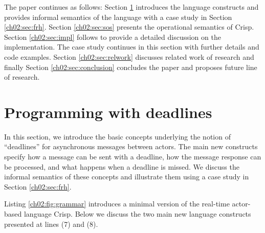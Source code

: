 
The paper continues as follows: Section \ref{ch02:sec:deadlines} introduces the language constructs
and provides informal semantics of the language with a case study in Section \ref{ch02:sec:frh}. 
Section \ref{ch02:sec:sos} presents the operational semantics of Crisp.
Section \ref{ch02:sec:impl} follows to provide a detailed discussion on the implementation.
The case study continues in this section with further details and code examples.
Section \ref{ch02:sec:relwork} discusses related work of research and 
finally Section \ref{ch02:sec:conclusion} concludes the paper and proposes future line of research.

\section{Programming with deadlines} \label{ch02:sec:deadlines}
In this section, we introduce the basic concepts underlying  the notion of ``deadlines'' for asynchronous messages between actors. 
The main new constructs specify how a message can be sent with a deadline, how the message response can be processed, and what happens when a deadline is missed.
We discuss the informal semantics of these concepts  and illustrate them using a case study in Section \ref{ch02:sec:frh}.

Listing \ref{ch02:fig:grammar} introduces a minimal version of the  real-time
actor-based language Crisp.
Below we discuss the two main new language constructs presented at lines (7) and (8).

